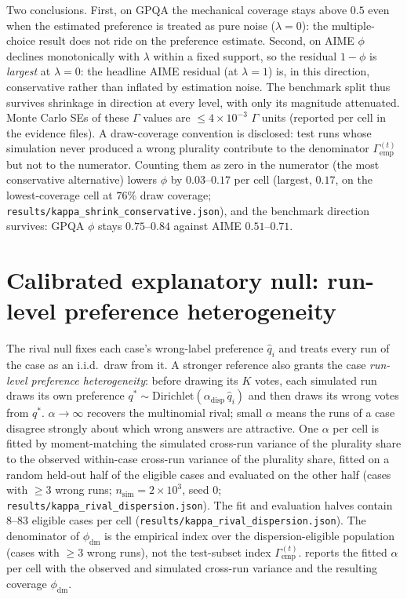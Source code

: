 \documentclass{article}
\newcommand{\agreementIndex}{\Gamma}
\begin{document}
Two conclusions. First, on GPQA the mechanical coverage stays above $0.5$ even when the estimated preference is treated as pure noise
($\lambda=0$): the multiple-choice result does not ride on the
preference estimate. Second, on AIME $\phi$ declines monotonically with
$\lambda$ within a fixed support, so the residual $1-\phi$ is
\emph{largest} at $\lambda=0$: the headline AIME residual (at
$\lambda=1$) is, in this direction, conservative rather than inflated
by estimation noise. The benchmark split thus survives shrinkage in
direction at every level, with only its magnitude attenuated. Monte
Carlo SEs of these $\agreementIndex$ values are $\le4\times10^{-3}$ $\agreementIndex$ units (reported per cell in the evidence files). A draw-coverage convention is disclosed: test runs whose simulation never produced a wrong plurality contribute to the denominator $\agreementIndex_{\mathrm{emp}}^{(t)}$ but not to the numerator. Counting them as zero in the numerator (the most conservative alternative) lowers $\phi$ by $0.03$--$0.17$ per cell (largest, $0.17$, on the
lowest-coverage cell at $76\%$ draw coverage;
\texttt{results/kappa\_shrink\_conservative.json}), and the benchmark
direction survives: GPQA $\phi$ stays $0.75$--$0.84$ against AIME
$0.51$--$0.71$.

\section{Calibrated explanatory null: run-level preference heterogeneity}
\label{app:dispersion}

The rival null fixes each case's wrong-label preference $\hat q_i$ and
treats every run of the case as an i.i.d.\ draw from it. A stronger
reference also grants the case \emph{run-level preference
heterogeneity}: before drawing its $K$ votes, each simulated run draws
its own preference $q^*\sim\mathrm{Dirichlet}(\alpha_{\mathrm{disp}}\,\hat q_i)$ and
then draws its wrong votes from $q^*$. $\alpha\to\infty$ recovers the
multinomial rival; small $\alpha$ means the runs of a case disagree
strongly about which wrong answers are attractive. One $\alpha$ per cell is fitted by moment-matching the simulated cross-run variance of the
plurality share to the observed within-case cross-run variance of the
plurality share, fitted on a random held-out half of the eligible cases and evaluated on the other half (cases with $\ge3$ wrong runs;
$n_{\mathrm{sim}}=2\times10^3$, seed 0;
\texttt{results/kappa\_rival\_dispersion.json}). The fit and
evaluation halves contain $8$--$83$ eligible cases per cell
(\texttt{results/kappa\_rival\_dispersion.json}). The denominator of
$\phi_{\mathrm{dm}}$ is the empirical index over the
dispersion-eligible population (cases with $\ge3$ wrong runs), not the
test-subset index $\agreementIndex_{\mathrm{emp}}^{(t)}$. 
reports the fitted $\alpha$ per cell with the observed and simulated
cross-run variance and the resulting coverage $\phi_{\mathrm{dm}}$.
\end{document}
